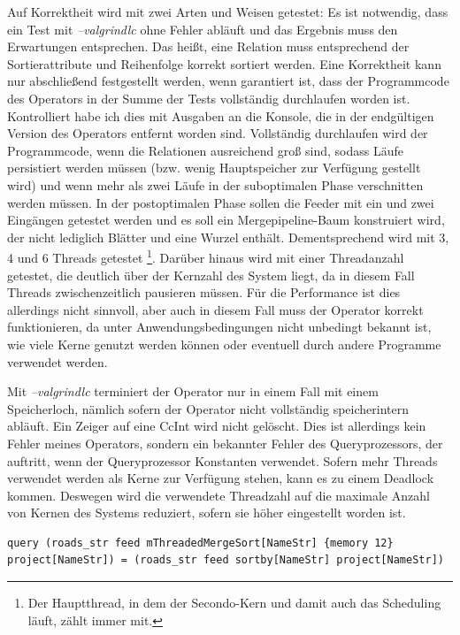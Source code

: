 \documentclass[a4paper,12pt,twoside]{article}
\newcommand{\Fb}[1]{\textit{#1}} %
\begin{document}
{Auf Korrektheit wird mit zwei Arten und Weisen getestet: Es ist notwendig, dass ein Test mit \Fb{--valgrindlc} ohne Fehler abläuft und das Ergebnis muss den Erwartungen entsprechen. Das heißt, eine Relation muss entsprechend der Sortierattribute und Reihenfolge korrekt sortiert werden. Eine Korrektheit kann nur abschließend festgestellt werden, wenn garantiert ist, dass der Programmcode des Operators in der Summe der Tests vollständig durchlaufen worden ist. Kontrolliert habe ich dies mit Ausgaben an die Konsole, die in der endgültigen Version des Operators entfernt worden sind. Vollständig durchlaufen wird der Programmcode, wenn die Relationen ausreichend groß sind, sodass Läufe persistiert werden müssen (bzw. wenig Hauptspeicher zur Verfügung gestellt wird) und wenn mehr als zwei Läufe in der suboptimalen Phase verschnitten werden müssen. In der postoptimalen Phase sollen die Feeder mit ein und zwei Eingängen getestet werden und es soll ein Mergepipeline-Baum konstruiert wird, der nicht lediglich Blätter und eine Wurzel enthält. Dementsprechend wird mit 3, 4 und 6 Threads getestet \footnote{Der Hauptthread, in dem der Secondo-Kern und damit auch das Scheduling läuft, zählt immer mit.}. Darüber hinaus wird mit einer Threadanzahl getestet, die deutlich über der Kernzahl des System liegt, da in diesem Fall Threads zwischenzeitlich pausieren müssen. Für die Performance ist dies allerdings nicht sinnvoll, aber auch in diesem Fall muss der Operator korrekt funktionieren, da unter Anwendungsbedingungen nicht unbedingt bekannt ist, wie viele Kerne genutzt werden können oder eventuell durch andere Programme verwendet werden.

Mit \Fb{--valgrindlc} terminiert der Operator nur in einem Fall mit einem Speicherloch, nämlich sofern der Operator nicht vollständig speicherintern abläuft. Ein Zeiger auf eine CcInt wird nicht gelöscht. Dies ist allerdings kein Fehler meines Operators, sondern ein bekannter Fehler des Queryprozessors, der auftritt, wenn der Queryprozessor Konstanten verwendet. Sofern mehr Threads verwendet werden als Kerne zur Verfügung stehen, kann es zu einem Deadlock kommen. Deswegen wird die verwendete Threadzahl auf die maximale Anzahl von Kernen des Systems reduziert, sofern sie höher eingestellt worden ist. 

\begin{minipage}{\linewidth}
	\begin{lstlisting}[caption={Beispiel Testqueries für den Sort-Operator}, label=list:testsort]
	query (roads_str feed mThreadedMergeSort[NameStr] {memory 12} project[NameStr]) = (roads_str feed sortby[NameStr] project[NameStr]) 
	\end{lstlisting}
\end{minipage}

}
\end{document}

